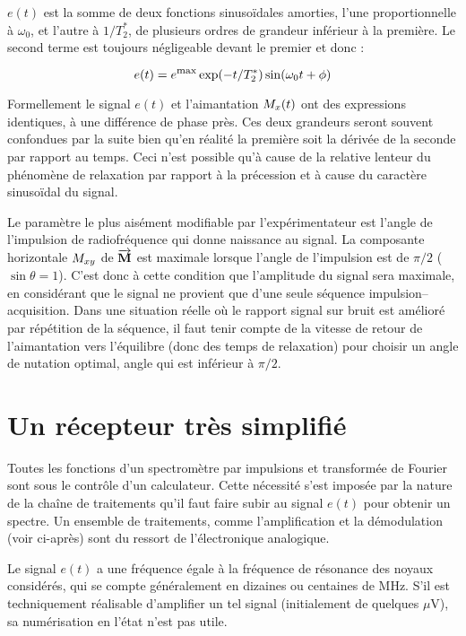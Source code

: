 $e(t)$ est la somme de deux fonctions sinusoïdales amorties, l'une proportionnelle à
$\omega_0$, et l'autre à $1/T_2^*$, de plusieurs ordres de grandeur
inférieur à la première.
Le second terme est toujours négligeable devant le premier et donc :

\begin{equation}
e(t) = e^{\mbox{\footnotesize{max}}} \exp(-t/T_2^*) \sin(\omega_0 t + \phi)
\end{equation}

Formellement le signal $e(t)$ et l'aimantation $M_x(t)$ ont des expressions identiques,
à une différence de phase près.
Ces deux grandeurs seront souvent confondues par la suite bien qu'en réalité la première soit
la dérivée de la seconde par rapport au temps.
Ceci n'est possible qu'à cause de la
relative lenteur du phénomène de relaxation par rapport à la précession et à cause du
caractère sinusoïdal du signal.

Le paramètre le plus aisément modifiable par
l'expérimentateur est l'angle de l'impulsion de radiofréquence qui donne naissance au signal.
La composante horizontale $M_{xy}$ de $\overrightarrow{\mathbf{M}}$ est maximale lorsque l'angle de l'impulsion est de
$\pi / 2$ ($\sin\theta=1$).
C'est donc à cette condition que l'amplitude du signal sera maximale,
en considérant que le signal ne provient que d'une seule séquence
impulsion--acquisition.
Dans une situation réelle où le rapport signal sur bruit est amélioré par
répétition de la séquence, il faut tenir compte de la vitesse de retour
de l'aimantation vers l'équilibre (donc des temps de relaxation) pour
choisir un angle de nutation optimal, angle qui est inférieur à $\pi/2$.

\section{Un récepteur très simplifié}
\label{sec:recept}

Toutes les fonctions d'un spectromètre par
impulsions et transformée de Fourier sont sous le contrôle d'un calculateur.
Cette nécessité s'est imposée par la nature de la chaîne de traitements qu'il faut faire subir au
signal $e(t)$ pour obtenir un spectre.
Un ensemble de traitements, comme l'amplification
et la démodulation (voir ci-après) sont du ressort de l'électronique analogique.

Le signal $e(t)$ a une fréquence égale à la fréquence de résonance des noyaux considérés,
qui se compte généralement en dizaines ou centaines de MHz.
S'il est techniquement
réalisable d'amplifier un tel signal (initialement de quelques $\mu$V), sa numérisation en
l'état n'est pas utile.

